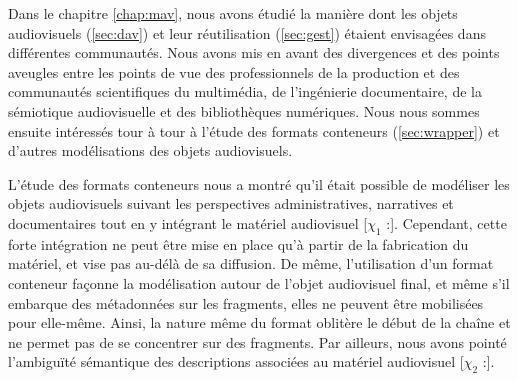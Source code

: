 Dans le chapitre \ref{chap:mav}, nous avons étudié la manière dont les objets audiovisuels (\ref{sec:dav}) et leur réutilisation (\ref{sec:gest}) étaient envisagées dans différentes communautés.
Nous avons mis en avant des divergences et des points aveugles entre les points de vue des professionnels de la production et des communautés scientifiques du multimédia, de l'ingénierie documentaire, de la sémiotique audiovisuelle et des bibliothèques numériques.
Nous nous sommes ensuite intéressés tour à tour à l'étude des formats conteneurs (\ref{sec:wrapper}) et d'autres modélisations des objets audiovisuels.

L'étude des formats conteneurs nous a montré qu'il était possible de modéliser les objets audiovisuels suivant les perspectives administratives, narratives et documentaires tout en y intégrant le matériel audiovisuel [$\chi_1$ :]. 
Cependant, cette forte intégration ne peut être mise en place qu'à partir de la fabrication du matériel, et vise pas au-délà de sa diffusion.
De même, l'utilisation d'un format conteneur façonne la modélisation autour de l'objet audiovisuel final, et même s'il embarque des métadonnées sur les fragments, elles ne peuvent être mobilisées pour elle-même.
Ainsi, la nature même du format oblitère le début de la chaîne et ne permet pas de se concentrer sur des fragments.
Par ailleurs, nous avons pointé l'ambiguïté sémantique des descriptions associées au matériel audiovisuel [$\chi_2$ :].


